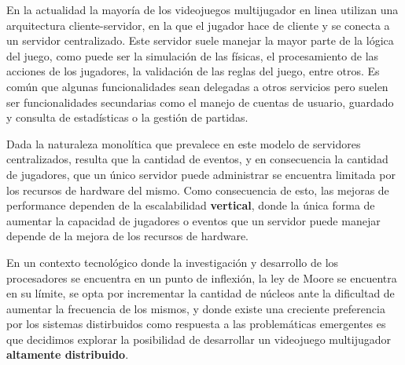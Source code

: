 
\noindent En la actualidad la mayoría de los videojuegos multijugador en linea
utilizan una arquitectura cliente-servidor, en la que el jugador
hace de cliente y se conecta a un servidor centralizado. Este servidor suele manejar
la mayor parte de la lógica del juego, como puede ser la simulación de las físicas, el procesamiento
de las acciones de los jugadores, la validación de las reglas del juego, entre otros.
Es común que algunas funcionalidades sean delegadas a otros servicios pero suelen ser funcionalidades
secundarias como el manejo de cuentas de usuario, guardado y consulta de estadísticas
o la gestión de partidas.

Dada la naturaleza monolítica que prevalece en este modelo de servidores centralizados,
resulta que la cantidad de eventos, y en consecuencia la cantidad de jugadores,
que un único servidor puede administrar se encuentra limitada por los recursos de hardware del mismo.
Como consecuencia de esto, las mejoras de performance dependen de la escalabilidad \textbf{vertical},
donde la única forma de aumentar la capacidad de jugadores o eventos que un servidor puede manejar
depende de la mejora de los recursos de hardware.

En un contexto tecnológico donde la investigación y desarrollo de los procesadores
se encuentra en un punto de inflexión, la ley de Moore se encuentra en su límite,
se opta por incrementar la cantidad de núcleos ante la dificultad de aumentar la frecuencia de los mismos,
y donde existe una creciente preferencia por los sistemas distirbuidos como  respuesta a las problemáticas
emergentes es que decidimos explorar la posibilidad de desarrollar un videojuego multijugador
\textbf{altamente distribuido}.



